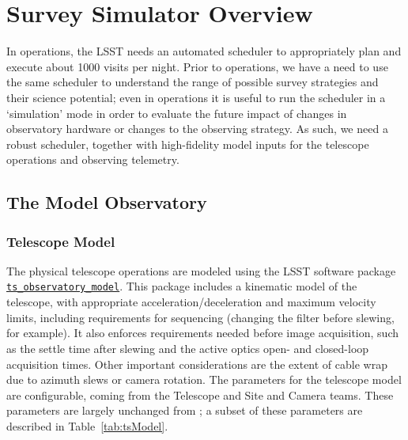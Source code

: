 \section{Survey Simulator Overview}
\label{section:simulator}

In operations, the LSST needs an automated scheduler to appropriately plan and execute about 1000 visits per night. Prior to operations, we have a need to use the same scheduler to understand the range of possible survey strategies and their science potential; even in operations it is useful to run the scheduler in a `simulation' mode in order to evaluate the future impact of changes in observatory hardware or changes to the observing strategy. As such, we need a robust scheduler, together with high-fidelity model inputs for the telescope operations and observing telemetry.  

\subsection{The Model Observatory}


\subsubsection{Telescope Model}

The physical telescope operations are modeled using the LSST software package \href{https://github.com/lsst-ts/ts_observatory_model}{\tt ts\_observatory\_model}. This package includes a kinematic model of the telescope, with appropriate acceleration/deceleration and maximum velocity limits, including requirements for sequencing (changing the filter before slewing, for example). It also enforces requirements needed before image acquisition, such as the settle time after slewing and the active optics open- and closed-loop acquisition times. Other important considerations are the extent of cable wrap due to azimuth slews or camera rotation. The parameters for the telescope model are configurable, coming from the Telescope and Site and Camera teams. These parameters are largely unchanged from \citet{2014SPIE.9150E..15D}; a subset of these parameters are described in Table~\ref{tab:tsModel}. 

